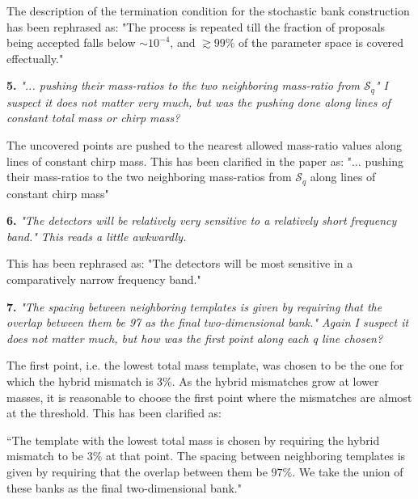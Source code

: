 \documentclass[a4paper,12pt]{article}
\begin{document}
The description of the termination condition for the stochastic 
bank construction has been rephrased as: 
"The process is repeated till the fraction of 
proposals being accepted falls below $\sim 10^{-4}$, and $\gtrsim 99\%$
of the parameter space is covered effectually."
\vspace{12pt}

{\bf 5.} \textit{"... pushing their mass-ratios to the two neighboring mass-ratio
from $\mathcal{S}_q$" I suspect it does not matter very much, but was the pushing
done along lines of constant total mass or chirp mass?}
\vspace{8pt}

The uncovered points are pushed to the nearest allowed mass-ratio values
along lines of constant chirp mass. This has been clarified in the paper as: 
"... pushing their mass-ratios to the two neighboring mass-ratios from
$\mathcal{S}_q$ along lines of constant chirp mass"

\vspace{12pt}

{\bf 6.} \textit{ "The detectors will be relatively very sensitive to a relatively
short frequency band." This reads a little awkwardly.}
\vspace{8pt}

This has been rephrased as: "The detectors will be most sensitive in a 
comparatively narrow frequency band."
\vspace{12pt}

{\bf 7.} \textit{"The spacing between neighboring templates is given by requiring
that the overlap between them be 97%
as the final two-dimensional bank." Again I suspect it does not matter
much, but how was the first point along each q line chosen?}
\vspace{8pt}

The first point, i.e. the lowest total mass template, was chosen to
be the one for which the hybrid mismatch is 3\%. As the hybrid mismatches
grow at lower masses, it is reasonable to choose the 
first point where the mismatches are almost at the threshold.
This has been clarified as:

\vspace{5pt}
``The template with the lowest total mass is chosen by requiring the
 hybrid mismatch to be $3\%$ at that point. The spacing between 
 neighboring templates is given by requiring that the overlap between
 them be $97\%$. We take the union of these banks as the final 
 two-dimensional bank."


\end{document}
